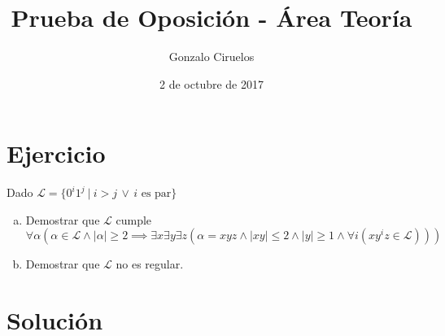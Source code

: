 \documentclass[hidelinks,a4paper,11pt, nofootinbib]{article}
\title{Prueba de Oposición - Área Teoría}
\author{Gonzalo Ciruelos}
\date{2 de octubre de 2017}
\newcommand{\ele}{\mathcal{L}}
\begin{document}
\maketitle

\section*{Ejercicio}

Dado $\ele = \{0^i 1^j\ |\ i > j \, \lor \, i \text{ es par}\}$

\begin{enumerate}[a.]
\item Demostrar que $\ele$ cumple
  \[\forall \alpha( \alpha \in \ele \land |\alpha| \geq 2 \implies 
            \exists x \exists y  \exists z (
                        \alpha = x y z \land
                        |x y| \leq 2 \land
                        |y| \geq 1 \land
                        \forall i (x y^i z \in \ele))) \]
\item Demostrar que $\ele$ no es regular.
\end{enumerate}
                         
\section*{Solución}
\end{document}
